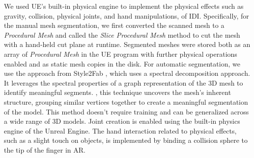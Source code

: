We used UE's built-in physical engine to implement the physical effects such as gravity, collision, physical joints, and hand manipulations, of IDI. 
Specifically, for the manual mesh segmentation, we first converted the scanned mesh to a \emph{Procedural Mesh} and called the \emph{Slice Procedural Mesh} method to cut the mesh with a hand-held cut plane at runtime. 
Segmented meshes were stored both as an array of \emph{Procedural Mesh} in the UE program with further physical operations enabled and as static mesh copies in the disk. 
For automatic segmentation, we use the approach from Style2Fab \cite{10.1145/3586183.3606723}, which uses a spectral decomposition approach. It leverages the spectral properties of a graph representation of the 3D mesh to identify meaningful segments. , this technique uncovers the mesh's inherent structure, grouping similar vertices together to create a meaningful segmentation of the model.   This method doesn’t require training and can be generalized across a wide range of 3D models.
Joint creation is enabled using the built-in physics engine of the Unreal Engine. 
The hand interaction related to physical effects, such as a slight touch on objects, is implemented by binding a collision sphere to the tip of the finger in AR. 





